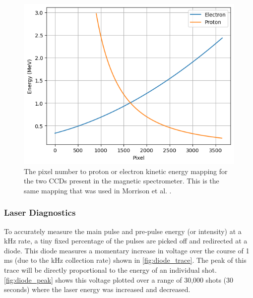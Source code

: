 \begin{figure}
	\centering 
	\includegraphics[width=0.75\linewidth]{planning/images/daq/pixel.png}
	\caption{The pixel number to proton or electron kinetic energy mapping for the two CCDs present in the magnetic spectrometer. This is the same mapping that was used in Morrison et al. \cite{Morrison_2018_NJoP}.}
	\label{fig:pixel_energy}
\end{figure}

\subsubsection{Laser Diagnostics}
To accurately measure the main pulse and pre-pulse energy (or intensity) at a kHz rate, a tiny fixed percentage of the pulses are picked off and redirected at a diode. This diode measures a momentary increase in voltage over the course of 1 ms (due to the kHz collection rate) shown in \autoref{fig:diode_trace}. The peak of this trace will be directly proportional to the energy of an individual shot. \autoref{fig:diode_peak} shows this voltage plotted over a range of 30,000 shots (30 seconds) where the laser energy was increased and decreased.

